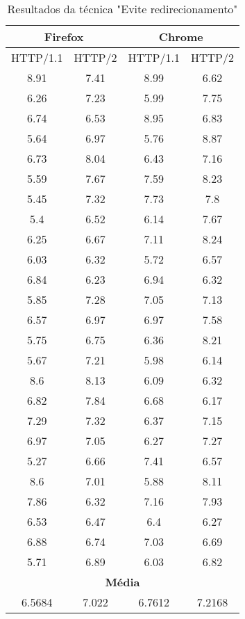 \begin{table}[h]
	\centering
	\caption{Resultados da técnica "Evite redirecionamento"}
	\label{resultados-redirecionamento}
	\begin{tabular}{cccc}
		\hline
		\multicolumn{2}{c}{\textbf{Firefox}} & \multicolumn{2}{c}{\textbf{Chrome}} \\
		\hline
		HTTP/1.1 & HTTP/2 & HTTP/1.1 & HTTP/2 \\
		\hline
		8.91 & 7.41 & 8.99 & 6.62 \\
		6.26 & 7.23 & 5.99 & 7.75 \\
		6.74 & 6.53 & 8.95 & 6.83 \\
		5.64 & 6.97 & 5.76 & 8.87 \\
		6.73 & 8.04 & 6.43 & 7.16 \\
		5.59 & 7.67 & 7.59 & 8.23 \\
		5.45 & 7.32 & 7.73 & 7.8 \\
		5.4 & 6.52 & 6.14 & 7.67 \\
		6.25 & 6.67 & 7.11 & 8.24 \\
		6.03 & 6.32 & 5.72 & 6.57 \\
		6.84 & 6.23 & 6.94 & 6.32 \\
		5.85 & 7.28 & 7.05 & 7.13 \\
		6.57 & 6.97 & 6.97 & 7.58 \\
		5.75 & 6.75 & 6.36 & 8.21 \\
		5.67 & 7.21 & 5.98 & 6.14 \\ 
		8.6 & 8.13 & 6.09 & 6.32 \\
		6.82 & 7.84 & 6.68 & 6.17 \\
		7.29 & 7.32 & 6.37 & 7.15 \\
		6.97 & 7.05 & 6.27 & 7.27 \\
		5.27 & 6.66 & 7.41 & 6.57 \\
		8.6 & 7.01 & 5.88 & 8.11 \\
		7.86 & 6.32 & 7.16 & 7.93 \\
		6.53 & 6.47 & 6.4 & 6.27 \\
		6.88 & 6.74 & 7.03 & 6.69 \\
		5.71 & 6.89 & 6.03 & 6.82 \\
		\hline
		\multicolumn{4}{c}{\textbf{Média}} \\
		6.5684 & 7.022 & 6.7612 & 7.2168 \\
		\hline
	\end{tabular}
\end{table}